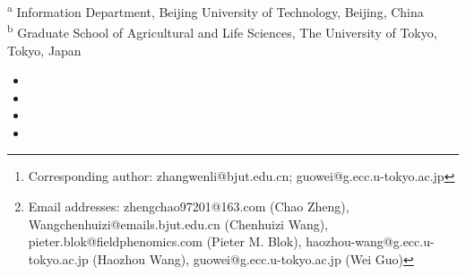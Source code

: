 \documentclass[12pt]{article}
\newcommand\blfootnote[1]{
    \begingroup
    \renewcommand\thefootnote{}\footnote{#1}
    \addtocounter{footnote}{-1}
    \endgroup
}
\begin{document}
\title{}
\author{
    Wenli Zhang \textsuperscript{a,*},
    Chao Zheng \textsuperscript{a},
    Chenhuizi Wang \textsuperscript{a},
    Pieter M. Blok \textsuperscript{b}, \\
    Haozhou Wang \textsuperscript{b},
    Wei Guo \textsuperscript{b,*}
    \blfootnote{Corresponding author: zhangwenli@bjut.edu.cn; guowei@g.ecc.u-tokyo.ac.jp }
    \blfootnote{Email addresses: zhengchao97201@163.com (Chao Zheng), Wangchenhuizi@emails.bjut.edu.cn (Chenhuizi Wang), pieter.blok@fieldphenomics.com (Pieter M. Blok), haozhou-wang@g.ecc.u-tokyo.ac.jp (Haozhou Wang), guowei@g.ecc.u-tokyo.ac.jp (Wei Guo)}
}
\date{}

\maketitle

\noindent\textsuperscript{a} Information Department, Beijing University of Technology, Beijing, China \\
\textsuperscript{b} Graduate School of Agricultural and Life Sciences, The University of Tokyo, Tokyo, Japan\\

\textbf{}


\begin{itemize}
  \item {}
  \item {}
  \item {}
  \item {}
\end{itemize}
\end{document}
